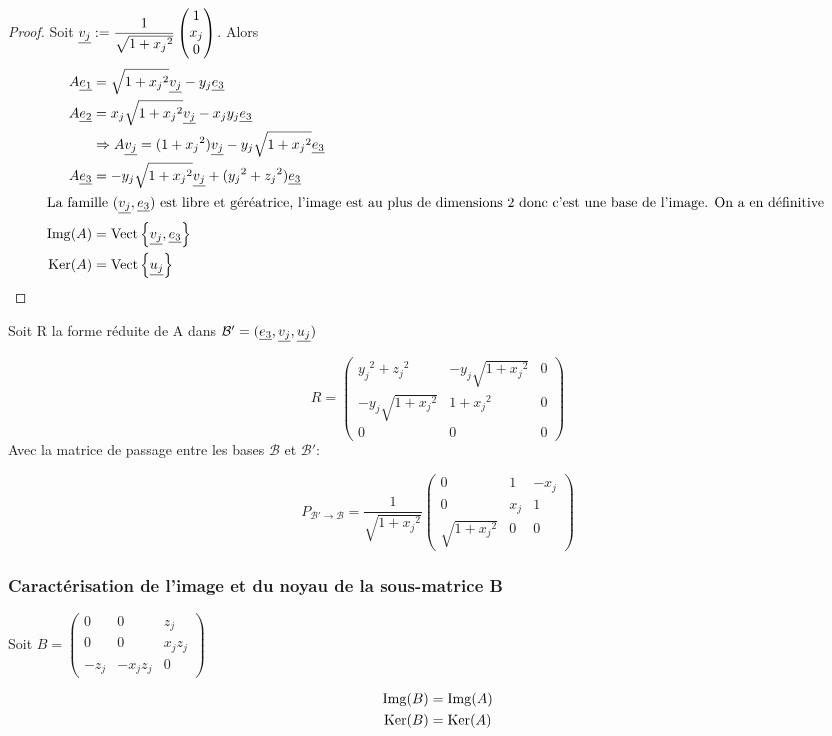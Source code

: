 \begin{proof}
  Soit ${\underline{v_j}} := \dfrac{1}{\sqrt{1 + {x_j}^2}}\begin{pmatrix} 1\\{x_j}\\0\end{pmatrix}$.
  Alors
    \begin{align*}
    A \underline{e_1} &= \sqrt{1+{x_j}^2}{\underline{v_j}} - {y_j} \underline{e_3}\\
    A \underline{e_2} &= {x_j}\sqrt{1+{x_j}^2}{\underline{v_j}} -{x_jy_j} \underline{e_3}\\
    & \Rightarrow A {\underline{v_j}} = (1+{x_j}^2) {\underline{v_j}} - {y_j}\sqrt{1+{x_j}^2} \underline{e_3}\\
    A \underline{e_3} &= -{y_j}\sqrt{1+{x_j}^2}{\underline{v_j}} +({y_j}^2+{z_j}^2) \underline{e_3}\\
    \intertext{La famille $({\underline{v_j}},\underline{e_3})$ est libre et géréatrice, l'image est au plus de dimensions 2 donc c'est une base de l'image. On a en définitive }
    \operatorname{Img}(A) &= \operatorname{Vect}\left\lbrace{\underline{v_j}},\underline{e_3}\right\rbrace\\
    \operatorname{Ker}(A) &= \operatorname{Vect}\left\lbrace\underline{u_j}\right\rbrace
  \end{align*}
\end{proof}

\begin{prop}
  Soit R la forme réduite de A dans $\mathcal{B'}= (\underline{e_3},{\underline{v_j}},{\underline{u_j}})$

  \[
    R =
    \begin{pmatrix}
      {y_j}^2+{z_j}^2 & -{y_j}\sqrt{1+{x_j}^2} & 0   \\
      -{y_j}\sqrt{1+{x_j}^2} &1+ {x_j}^2 &0 \\
      0 & 0 & 0
    \end{pmatrix}
  \]
  Avec la matrice de passage entre les bases $\mathcal B$ et $\mathcal B'$:

  \[
    P_{\mathcal B' \rightarrow \mathcal B} = \frac{1}{\sqrt{1+{x_j}^2}}
    \begin{pmatrix}
      0 & 1 & -{x_j} \\
      0 & {x_j} & 1 \\
      \sqrt{1+{x_j}^2} & 0 &0
    \end{pmatrix}
  \]
\end{prop}

\subsubsection{Caractérisation de l'image et du noyau de la sous-matrice B}
Soit $B = \begin{pmatrix} 0 & 0 & {z_j} \\ 0 & 0 & {x_jz_j} \\ -{z_j} & -{x_jz_j} & 0\end{pmatrix}$
\begin{prop}
  \begin{align*}
    \operatorname{Img}(B) &= \operatorname{Img}(A) \\
    \operatorname{Ker}(B) &= \operatorname{Ker}(A)
  \end{align*}
\end{prop}

